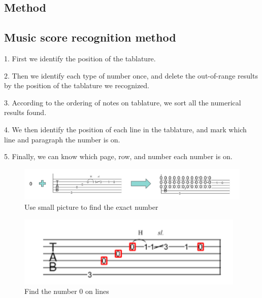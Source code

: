 \documentclass[10pt,twocolumn,letterpaper]{article}
\begin{document}
\begin{CJK}{UTF8}{bsmi}
\section{Method}

\subsection{Music score recognition method}
\begin{description}
\item 1. First we identify the position of the tablature.
\item 2. Then we identify each type of number once, and delete the out-of-range results by the position of the tablature we recognized.
\item 3. According to the ordering of notes on tablature, we sort all the numerical results found.
\item 4. We then identify the position of each line in the tablature, and mark which line and paragraph the number is on.
\item 5. Finally, we can know which page, row, and number each number is on.
\end{description}


\begin{figure}[t]
\begin{center}
   \includegraphics[width=0.8\linewidth]{method_1.png}
\end{center}
   \caption{Use small picture to find the exact number}
\label{fig:method_1}
\end{figure}

\begin{figure}[t]
\begin{center}
   \includegraphics[width=0.8\linewidth]{method_2.png}
\end{center}
   \caption{Find the number 0 on lines}
\label{fig:method_2}
\end{figure}



\end{CJK}
\end{document}
